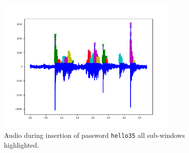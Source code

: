 \begin{figure}[h]
     \centering
	 \includegraphics[width=0.8\textwidth]{Images/AcCAPPCHA/hello35_time}
     \caption{\footnotesize{Audio during insertion of password \texttt{hello35} all sub-windows highlighted.}}\label{AcCAPPCHA:hello35_time}
\end{figure}
